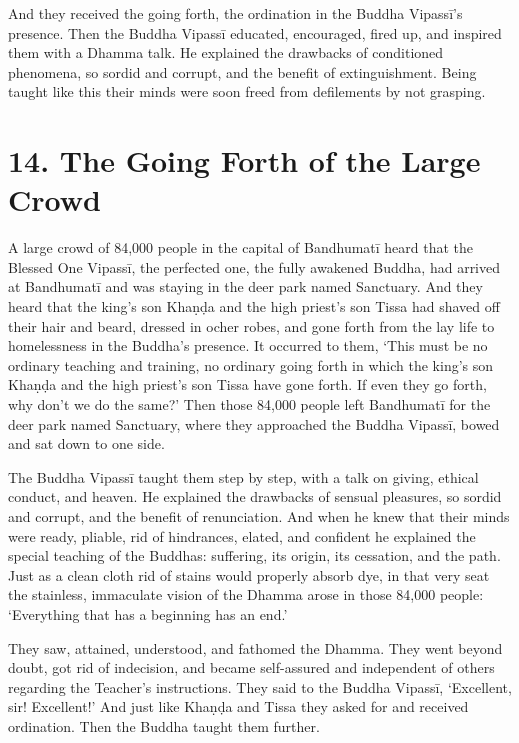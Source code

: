 \documentclass[12pt,openany]{book}%
\begin{document}
And they received the going forth, the ordination in the Buddha \textsanskrit{Vipassī}’s presence. Then the Buddha \textsanskrit{Vipassī} educated, encouraged, fired up, and inspired them with a Dhamma talk. He explained the drawbacks of conditioned phenomena, so sordid and corrupt, and the benefit of extinguishment. Being taught like this their minds were soon freed from defilements by not grasping. 

\section*{14. The Going Forth of the Large Crowd }

A large crowd of 84,000 people in the capital of \textsanskrit{Bandhumatī} heard that the Blessed One \textsanskrit{Vipassī}, the perfected one, the fully awakened Buddha, had arrived at \textsanskrit{Bandhumatī} and was staying in the deer park named Sanctuary. And they heard that the king’s son \textsanskrit{Khaṇḍa} and the high priest’s son Tissa had shaved off their hair and beard, dressed in ocher robes, and gone forth from the lay life to homelessness in the Buddha’s presence. It occurred to them, ‘This must be no ordinary teaching and training, no ordinary going forth in which the king’s son \textsanskrit{Khaṇḍa} and the high priest’s son Tissa have gone forth. If even they go forth, why don’t we do the same?’ Then those 84,000 people left \textsanskrit{Bandhumatī} for the deer park named Sanctuary, where they approached the Buddha \textsanskrit{Vipassī}, bowed and sat down to one side. 

The Buddha \textsanskrit{Vipassī} taught them step by step, with a talk on giving, ethical conduct, and heaven. He explained the drawbacks of sensual pleasures, so sordid and corrupt, and the benefit of renunciation. And when he knew that their minds were ready, pliable, rid of hindrances, elated, and confident he explained the special teaching of the Buddhas: suffering, its origin, its cessation, and the path. Just as a clean cloth rid of stains would properly absorb dye, in that very seat the stainless, immaculate vision of the Dhamma arose in those 84,000 people: ‘Everything that has a beginning has an end.’ 

They saw, attained, understood, and fathomed the Dhamma. They went beyond doubt, got rid of indecision, and became self-assured and independent of others regarding the Teacher’s instructions. They said to the Buddha \textsanskrit{Vipassī}, ‘Excellent, sir! Excellent!’ And just like \textsanskrit{Khaṇḍa} and Tissa they asked for and received ordination. Then the Buddha taught them further. 
\end{document}
